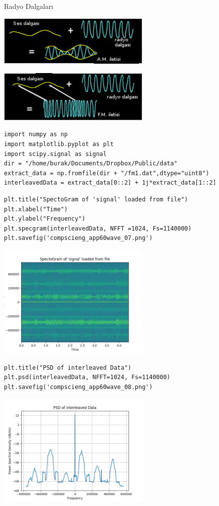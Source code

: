 \documentclass[12pt,fleqn]{article}\usepackage{../../common}
\begin{document}
Radyo Dalgaları

\includegraphics[width=20em]{AM_waves.jpg}

\includegraphics[width=20em]{FM_waves.jpg}

\begin{verbatim}
import numpy as np
import matplotlib.pyplot as plt
import scipy.signal as signal
dir = "/home/burak/Documents/Dropbox/Public/data"
extract_data = np.fromfile(dir + "/fm1.dat",dtype="uint8")
interleavedData = extract_data[0::2] + 1j*extract_data[1::2]
\end{verbatim}

\begin{verbatim}
plt.title("SpectoGram of 'signal' loaded from file")
plt.xlabel("Time")
plt.ylabel("Frequency")
plt.specgram(interleavedData, NFFT =1024, Fs=1140000)
plt.savefig('compscieng_app60wave_07.png')
\end{verbatim}

\includegraphics[width=20em]{compscieng_app60wave_07.png}

\begin{verbatim}
plt.title("PSD of interleaved Data")
plt.psd(interleavedData, NFFT=1024, Fs=1140000)
plt.savefig('compscieng_app60wave_08.png')
\end{verbatim}

\includegraphics[width=20em]{compscieng_app60wave_08.png}
\end{document}
